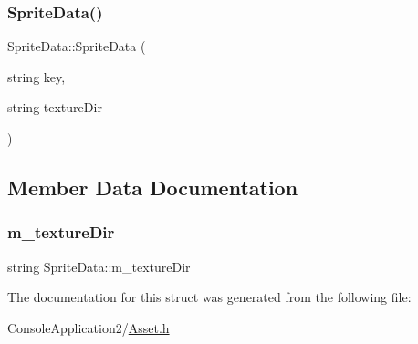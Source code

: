 \subsubsection{\texorpdfstring{Sprite\+Data()}{SpriteData()}}
{\footnotesize\ttfamily Sprite\+Data\+::\+Sprite\+Data (\begin{DoxyParamCaption}\item[{string}]{key,  }\item[{string}]{texture\+Dir }\end{DoxyParamCaption})\hspace{0.3cm}{\ttfamily [inline]}}



\subsection{Member Data Documentation}
\hypertarget{struct_sprite_data_ad855e92487241140b4e283da7d568863}{}\label{struct_sprite_data_ad855e92487241140b4e283da7d568863} 
\subsubsection{\texorpdfstring{m\+\_\+texture\+Dir}{m\_textureDir}}
{\footnotesize\ttfamily string Sprite\+Data\+::m\+\_\+texture\+Dir}



The documentation for this struct was generated from the following file\+:\begin{DoxyCompactItemize}
\item 
Console\+Application2/\hyperlink{_asset_8h}{Asset.\+h}\end{DoxyCompactItemize}
